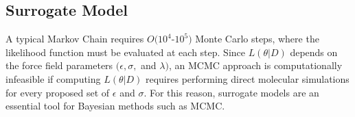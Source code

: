 \documentclass[journal=jctc,manuscript=article]{achemso}
\begin{document}
%

 



\subsection{Surrogate Model} \label{Surrogate Model}

A typical Markov Chain requires $O(10^4$-$10^5)$ Monte Carlo steps, where the likelihood function must be evaluated at each step. Since $L(\theta|D)$ depends on the force field parameters $(\epsilon, \sigma, $ and $\lambda)$, an MCMC approach is computationally infeasible if computing $L(\theta|D)$ requires performing direct molecular simulations for every proposed set of $\epsilon$ and $\sigma$. For this reason, surrogate models are an essential tool for Bayesian methods such as MCMC. 
\end{document}
